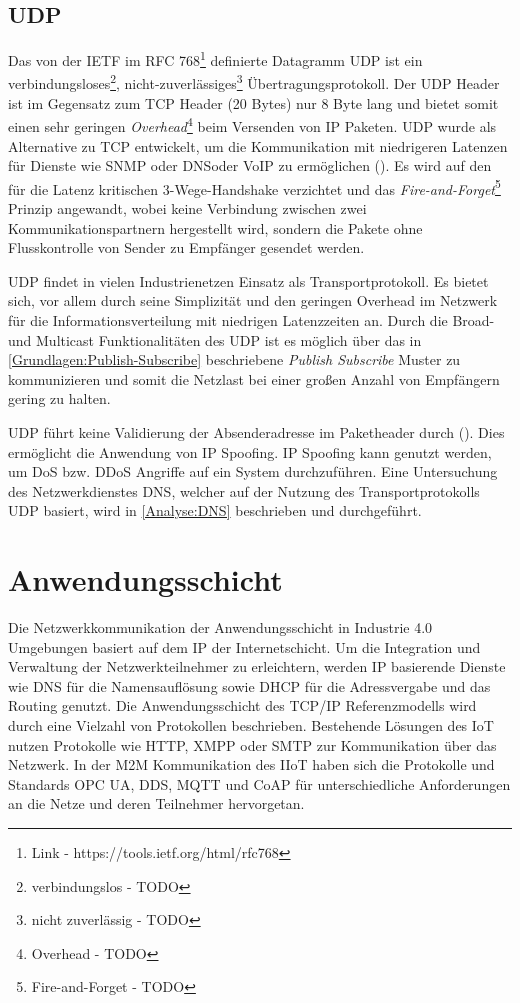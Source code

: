 \clearpage

\subsection{\ac{UDP}}
Das von der \ac{IETF} im \ac{RFC} 768\footnote{Link - https://tools.ietf.org/html/rfc768} definierte Datagramm \ac{UDP} ist ein verbindungsloses\footnote{verbindungslos - TODO}, nicht-zuverlässiges\footnote{nicht zuverlässig - TODO} Übertragungsprotokoll. Der \ac{UDP} Header ist im Gegensatz zum \ac{TCP} Header (20 Bytes) nur 8 Byte lang und bietet somit einen sehr geringen \textit{Overhead}\footnote{Overhead - TODO} beim Versenden von \ac{IP} Paketen. \ac{UDP} wurde als Alternative zu \ac{TCP} entwickelt, um die Kommunikation mit niedrigeren Latenzen für Dienste wie \ac{SNMP} oder \ac{DNS}oder \ac{VoIP} zu ermöglichen (\cite{UDP2003}). Es wird auf den für die Latenz kritischen 3-Wege-Handshake verzichtet und das \textit{Fire-and-Forget}\footnote{Fire-and-Forget - TODO} Prinzip angewandt, wobei keine Verbindung zwischen zwei Kommunikationspartnern hergestellt wird, sondern die Pakete ohne Flusskontrolle von Sender zu Empfänger gesendet werden.

\ac{UDP} findet in vielen Industrienetzen Einsatz als Transportprotokoll. Es bietet sich, vor allem durch seine Simplizität und den geringen Overhead im Netzwerk für die Informationsverteilung mit niedrigen Latenzzeiten an. Durch die Broad- und Multicast Funktionalitäten des \ac{UDP} ist es möglich über das in \autoref{Grundlagen:Publish-Subscribe} beschriebene \textit{Publish Subscribe} Muster zu kommunizieren und somit die Netzlast bei einer großen Anzahl von Empfängern gering zu halten.

\ac{UDP} führt keine Validierung der Absenderadresse im Paketheader durch (\cite{UDP2003}). Dies ermöglicht die Anwendung von \ac{IP} Spoofing. \ac{IP} Spoofing kann genutzt werden, um \ac{DoS} bzw. \ac{DDoS} Angriffe auf ein System durchzuführen. Eine Untersuchung des Netzwerkdienstes \ac{DNS}, welcher auf der Nutzung des Transportprotokolls \ac{UDP} basiert, wird in \autoref{Analyse:DNS} beschrieben und durchgeführt.

\section{Anwendungsschicht}
\label{Analyse:Anwendungsschicht}
Die Netzwerkkommunikation der Anwendungsschicht in Industrie 4.0 Umgebungen basiert auf dem \ac{IP} der Internetschicht. Um die Integration und Verwaltung der Netzwerkteilnehmer zu erleichtern, werden \ac{IP} basierende Dienste wie \ac{DNS} für die Namensauflösung sowie \ac{DHCP} für die Adressvergabe und das Routing genutzt. Die Anwendungsschicht des \ac{TCP}/\ac{IP} Referenzmodells wird durch eine Vielzahl von Protokollen beschrieben. Bestehende Lösungen des \ac{IoT} nutzen Protokolle wie \ac{HTTP}, \ac{XMPP} oder \ac{SMTP} zur Kommunikation über das Netzwerk. In der \ac{M2M} Kommunikation des \ac{IIoT} haben sich die Protokolle und Standards \ac{OPC UA}, \ac{DDS}, \ac{MQTT} und \ac{CoAP} für unterschiedliche Anforderungen an die Netze und deren Teilnehmer hervorgetan. 

